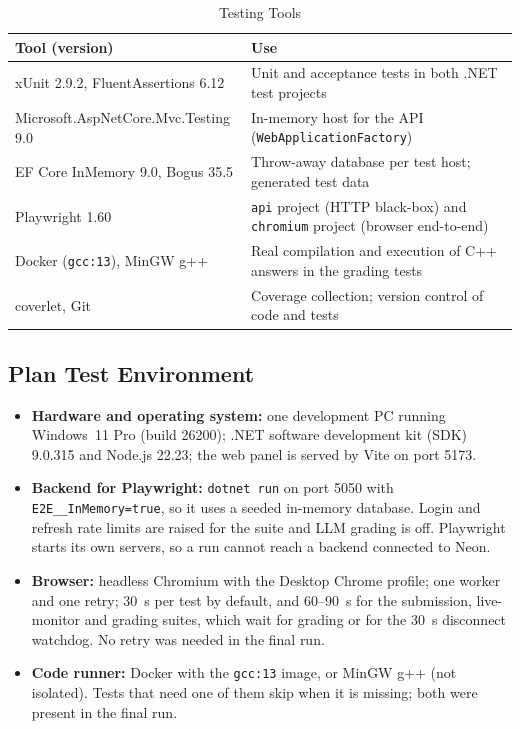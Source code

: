 \begin{table}[H]
\centering
\caption{Testing Tools}
\label{tab:test_tools}
\vspace{4pt}
{\small\setlength{\doublerulesep}{1pt}
\begin{tabular}{@{}P{5.0cm}P{10.4cm}@{}}
\hline\hline
\textbf{Tool (version)} & \textbf{Use} \\ \hline
xUnit 2.9.2, FluentAssertions 6.12 & Unit and acceptance tests in both .NET test projects \\
Microsoft.\allowbreak{}AspNetCore.\allowbreak{}Mvc.\allowbreak{}Testing 9.0 & In-memory host for the API (\texttt{WebApplicationFactory}) \\
EF Core InMemory 9.0, Bogus 35.5 & Throw-away database per test host; generated test data \\
Playwright 1.60 & \texttt{api} project (HTTP black-box) and \texttt{chromium} project (browser end-to-end) \\
Docker (\texttt{gcc:13}), MinGW g++ & Real compilation and execution of C++ answers in the grading tests \\
coverlet, Git & Coverage collection; version control of code and tests \\
\hline\hline
\end{tabular}}
\end{table}

\subsection{Plan Test Environment}
\begin{itemize}[nosep]
  \item \textbf{Hardware and operating system:} one development PC running Windows~11 Pro (build 26200); .NET software development kit (SDK) 9.0.315 and Node.js 22.23; the web panel is served by Vite on port 5173.
  \item \textbf{Backend for Playwright:} \texttt{dotnet run} on port 5050 with \texttt{E2E\_\_InMemory=true}, so it uses a seeded in-memory database. Login and refresh rate limits are raised for the suite and LLM grading is off. Playwright starts its own servers, so a run cannot reach a backend connected to Neon.
  \item \textbf{Browser:} headless Chromium with the Desktop Chrome profile; one worker and one retry; 30~s per test by default, and 60--90~s for the submission, live-monitor and grading suites, which wait for grading or for the 30~s disconnect watchdog. No retry was needed in the final run.
  \item \textbf{Code runner:} Docker with the \texttt{gcc:13} image, or MinGW g++ (not isolated). Tests that need one of them skip when it is missing; both were present in the final run.
\end{itemize}

